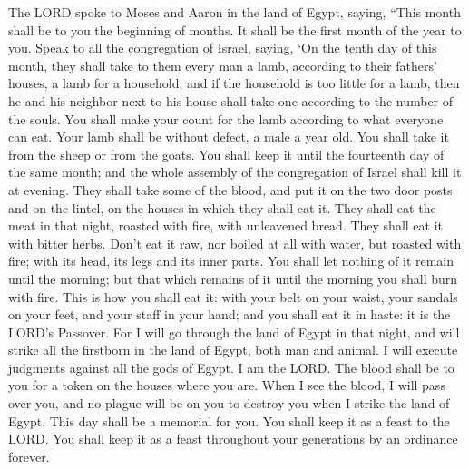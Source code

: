 \mychapter{} \myverse*{}The LORD spoke to Moses and Aaron in the land of Egypt, saying,
\myverse{}“This month shall be to you the beginning of months. It shall be the first
month of the year to you.
\myverse{}Speak to all the congregation of Israel, saying, ‘On the tenth day of this
month, they shall take to them every man a lamb, according to their fathers’ houses, a lamb for a household;
\myverse{}and if the household is too little for a lamb, then he and his neighbor next
to his house shall take one according to the number of the souls. You shall make your count for the lamb
according to what everyone can eat.
\myverse{}Your lamb shall be without defect, a male a year old. You shall take it from
the sheep or from the goats.
\myverse{}You shall keep it until the fourteenth day of the same month; and the whole
assembly of the congregation of Israel shall kill it at evening.
\myverse{}They shall take some of the blood, and put it on the two door posts and on
the lintel, on the houses in which they shall eat it.
\myverse{}They shall eat the meat in that night, roasted with fire, with unleavened bread.
They shall eat it with bitter herbs.
\myverse{}Don’t eat it raw, nor boiled at all with water, but roasted with fire; with
its head, its legs and its inner parts.
\myverse{}You shall let nothing of it remain until the morning; but that which remains
of it until the morning you shall burn with fire.
\myverse{}This is how you shall eat it: with your belt on your waist, your sandals
on your feet, and your staff in your hand; and you shall eat it in haste: it is the LORD’s Passover.
\myverse{}For I will go through the land of Egypt in that night, and will strike all
the firstborn in the land of Egypt, both man and animal. I will execute judgments against all the gods
of Egypt. I am the LORD.
\myverse{}The blood shall be to you for a token on the houses where you are. When I
see the blood, I will pass over you, and no plague will be on you to destroy you when I strike the land
of Egypt.
\myverse{}This day shall be a memorial for you. You shall keep it as a feast to the
LORD. You shall keep it as a feast throughout your generations by an ordinance forever.


